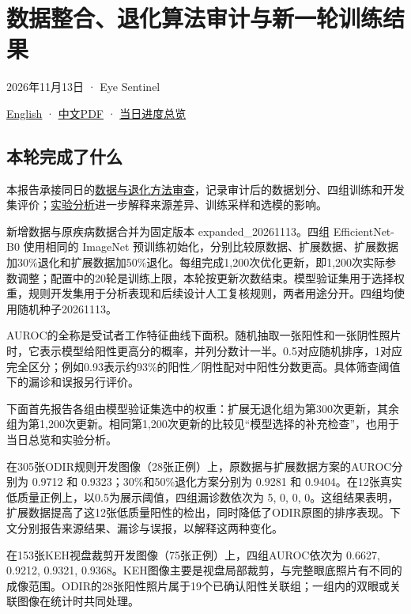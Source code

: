 \documentclass[
  10pt,
]{article}
\author{}
\date{}
\begin{document}
\section{数据整合、退化算法审计与新一轮训练结果}\label{ux6570ux636eux6574ux5408ux9000ux5316ux7b97ux6cd5ux5ba1ux8ba1ux4e0eux65b0ux4e00ux8f6eux8badux7ec3ux7ed3ux679c}

2026年11月13日 · Eye Sentinel

\href{training-results.en.md}{English} ·
\href{training-results.zh.pdf}{中文PDF} ·
\href{../progress-overview.zh.md}{当日进度总览}

\subsection{本轮完成了什么}\label{ux672cux8f6eux5b8cux6210ux4e86ux4ec0ux4e48}

本报告承接同日的\href{../data-review/data-and-degradation-review.zh.md}{数据与退化方法审查}，记录审计后的数据划分、四组训练和开发集评价；\href{../experimental-analysis/experimental-analysis.zh.md}{实验分析}进一步解释来源差异、训练采样和选模的影响。

新增数据与原疾病数据合并为固定版本 expanded\_20261113。四组
EfficientNet-B0 使用相同的 ImageNet
预训练初始化，分别比较原数据、扩展数据、扩展数据加30\%退化和扩展数据加50\%退化。每组完成1,200次优化更新，即1,200次实际参数调整；配置中的20轮是训练上限，本轮按更新次数结束。模型验证集用于选择权重，规则开发集用于分析表现和后续设计人工复核规则，两者用途分开。四组均使用随机种子20261113。

AUROC的全称是受试者工作特征曲线下面积。随机抽取一张阳性和一张阴性照片时，它表示模型给阳性更高分的概率，并列分数计一半。0.5对应随机排序，1对应完全区分；例如0.93表示约93\%的阳性／阴性配对中阳性分数更高。具体筛查阈值下的漏诊和误报另行评价。

下面首先报告各组由模型验证集选中的权重：扩展无退化组为第300次更新，其余组为第1,200次更新。相同第1,200次更新的比较见``模型选择的补充检查''，也用于当日总览和实验分析。

在305张ODIR规则开发图像（28张正例）上，原数据与扩展数据方案的AUROC分别为
0.9712 和 0.9323；30\%和50\%退化方案分别为 0.9281 和
0.9404。在12张真实低质量正例上，以0.5为展示阈值，四组漏诊数依次为 5, 0,
0,
0。这组结果表明，扩展数据提高了这12张低质量阳性的检出，同时降低了ODIR原图的排序表现。下文分别报告来源结果、漏诊与误报，以解释这两种变化。

在153张KEH视盘裁剪开发图像（75张正例）上，四组AUROC依次为 0.6627,
0.9212, 0.9321,
0.9368。KEH图像主要是视盘局部裁剪，与完整眼底照片有不同的成像范围。ODIR的28张阳性照片属于19个已确认阳性关联组；一组内的双眼或关联图像在统计时共同处理。
\end{document}
